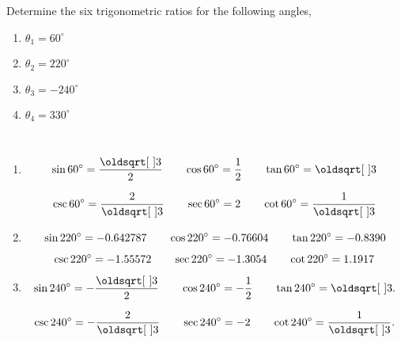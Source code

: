 \documentclass[12pt]{article} %
\begin{document}
  \begin{qstn}
    Determine the six trigonometric ratios for the following angles,
    \begin{multicols}{4}
      \begin{enumerate}[label=(\alph*)]
        \item $\theta_1 = 60^{\circ}$
          \columnbreak
        \item $\theta_2 = 220^{\circ}$
          \columnbreak
        \item $\theta_3 = -240^{\circ}$
          \columnbreak
        \item $\theta_4 = 330^{\circ}$
      \end{enumerate}
      
    \end{multicols}
    \begin{solution} \texttt{  }
      \begin{enumerate}[label=(\alph*)]
        \item 
        \[
            \sin 60^{\circ} = \frac{\sqrt{3}}{2} \hspace{0.7cm} \cos 60^{\circ} = \frac{1}{2} \hspace{0.7cm} 
            \tan 60^{\circ} = \sqrt{3} 
        \] 

        \[
            \csc 60^{\circ} = \frac{2}{\sqrt{3}} \hspace{0.7cm} \sec 60^{\circ} = 2 \hspace{0.7cm} 
            \cot 60^{\circ} = \frac{1}{\sqrt{3}} 
        \] 
      \item 
        \[
            \sin 220^{\circ} = -0.642787 \hspace{0.7cm} \cos 220^{\circ} = -0.76604 \hspace{0.7cm} 
            \tan 220^{\circ} = -0.8390 
        \] 

        \[
            \csc 220^{\circ} = -1.55572 \hspace{0.7cm} \sec 220^{\circ} = -1.3054 \hspace{0.7cm} 
            \cot 220^{\circ} = 1.1917 
        \] 
    \item 
        \[
            \sin 240^{\circ} = -\frac{\sqrt{3}}{2} \hspace{0.7cm} \cos 240^{\circ} = -\frac{1}{2} \hspace{0.7cm} 
            \tan 240^{\circ} = \sqrt{3}.  
        \] 

        \[
            \csc 240^{\circ} = -\frac{2}{\sqrt{3}} \hspace{0.7cm} \sec 240^{\circ} = -2 \hspace{0.7cm} 
            \cot 240^{\circ} = \frac{1}{\sqrt{3}}.  
        \] 


\end{enumerate}
\end{solution}
\end{qstn}
\end{document}
